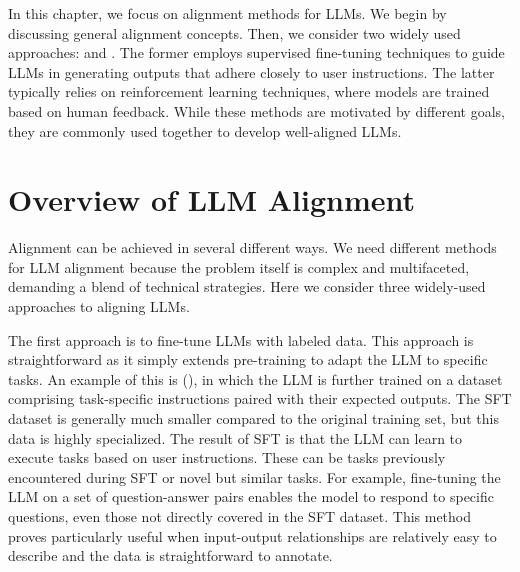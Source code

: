 In this chapter, we focus on alignment methods for LLMs. We begin by discussing general alignment concepts. Then, we consider two widely used approaches:  and . The former employs supervised fine-tuning techniques to guide LLMs in generating outputs that adhere closely to user instructions. The latter typically relies on reinforcement learning techniques, where models are trained based on human feedback. While these methods are motivated by different goals, they are commonly used together to develop well-aligned LLMs.


\section{Overview of LLM Alignment}

\noindent Alignment can be achieved in several different ways. We need different methods for LLM alignment because the problem itself is complex and multifaceted, demanding a blend of technical strategies. Here we consider three widely-used approaches to aligning LLMs.

The first approach is to fine-tune LLMs with labeled data. This approach is straightforward as it simply extends pre-training to adapt the LLM to specific tasks. An example of this is  (), in which the LLM is further trained on a dataset comprising task-specific instructions paired with their expected outputs. The SFT dataset is generally much smaller compared to the original training set, but this data is highly specialized. The result of SFT is that the LLM can learn to execute tasks based on user instructions. These can be tasks previously encountered during SFT or novel but similar tasks. For example, fine-tuning the LLM on a set of question-answer pairs enables the model to respond to specific questions, even those not directly covered in the SFT dataset. This method proves particularly useful when input-output relationships are relatively easy to describe and the data is straightforward to annotate.

